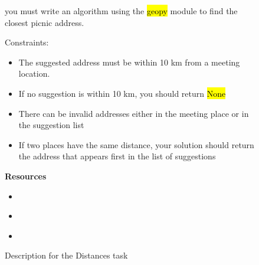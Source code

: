 \begin{figure}
\begin{mdframed}[backgroundcolor=gray!05]
\begin{scriptsize}
you must write an algorithm using the {\fontsize{8}{1}\selectfont\color{color_29791} \hl{geopy}}
module to find the closest picnic address. \medskip


Constraints:

\begin{itemize}


    \item  The suggested address must be within 10 km from a meeting location.

    \item  If no suggestion is within 10 km, you should return {\fontsize{8}{1}\selectfont\color{color_29791} \hl{None}}

    \item  There can be invalid addresses either in the meeting place or in the suggestion list

    \item  If two places have the same distance, your solution should return the address that appears first in the list of suggestions 


\end{itemize}

\end{scriptsize}
\end{mdframed}
\end{figure}





\begin{figure}[t]
\begin{mdframed}[backgroundcolor=gray!05] 
\begin{scriptsize}


\textbf{Resources}

\begin{itemize}
    \item \href{}{}
    \item \href{}{}
    \item \href{}{}
\end{itemize}

\end{scriptsize}
\end{mdframed}
\caption{Description for the Distances task}
\end{figure}

    
